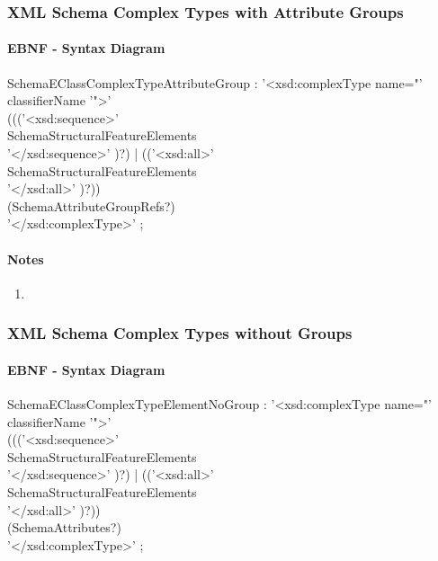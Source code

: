 \documentclass[11pt,a4paper]{article}
\begin{document}
\subsubsection{XML Schema Complex Types with Attribute Groups}
\paragraph{EBNF - Syntax Diagram}
\begin{rail}
SchemaEClassComplexTypeAttributeGroup :
'<xsd:complexType name="' classifierName '">' \\
((('<xsd:sequence>' \\
SchemaStructuralFeatureElements \\
'</xsd:sequence>' )?) 
| (('<xsd:all>' \\
SchemaStructuralFeatureElements \\
'</xsd:all>' )?))\\
(SchemaAttributeGroupRefs?) \\
'</xsd:complexType>' ;
\end{rail}

\paragraph{Notes}
\begin{enumerate}
\item
\end{enumerate}

\subsubsection{XML Schema Complex Types without Groups}
\paragraph{EBNF - Syntax Diagram}
\begin{rail}
SchemaEClassComplexTypeElementNoGroup :
'<xsd:complexType name="' classifierName '">' \\
((('<xsd:sequence>' \\
SchemaStructuralFeatureElements \\
'</xsd:sequence>' )?)
| (('<xsd:all>' \\
SchemaStructuralFeatureElements \\
'</xsd:all>' )?))\\
(SchemaAttributes?) \\
'</xsd:complexType>' ;
\end{rail}
\end{document}
